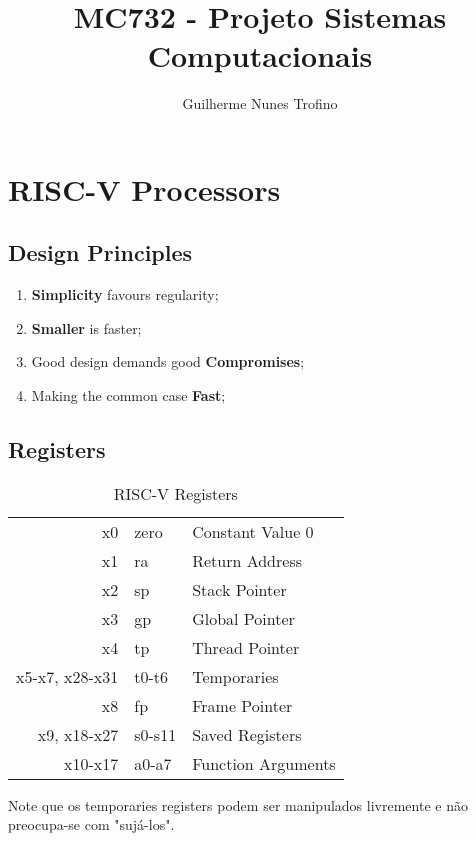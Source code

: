 \documentclass{article}
\title{MC732 - Projeto Sistemas Computacionais}
\author{Guilherme Nunes Trofino}
\begin{document}
    \maketitle
\newpage

    \tableofcontents
\newpage
\section{}


\section{RISC-V Processors}
\subsection{Design Principles}
    \begin{enumerate}
        \item \textbf{Simplicity} favours regularity;
        \item \textbf{Smaller} is faster;
        \item Good design demands good \textbf{Compromises};
        \item Making the common case \textbf{Fast};
    \end{enumerate}

\subsection{Registers}
    \begin{table}[H]
        \centering\begin{tabular}{rl | l}\hline
            x0              & zero  & Constant Value 0\\
            x1              & ra    & Return Address\\
            x2              & sp    & Stack Pointer\\
            x3              & gp    & Global Pointer\\
            x4              & tp    & Thread Pointer\\
            x5-x7, x28-x31  & t0-t6 & Temporaries\\
            x8              & fp    & Frame Pointer\\
            x9,    x18-x27  & s0-s11& Saved Registers\\
            x10-x17         & a0-a7 & Function Arguments\\\hline
        \end{tabular}
        \caption{RISC-V Registers}
        \label{tab:riscvRegisers}
    \end{table}
\noindent Note que os temporaries registers podem ser manipulados livremente e não preocupa-se com "sujá-los".\\
\end{document}
